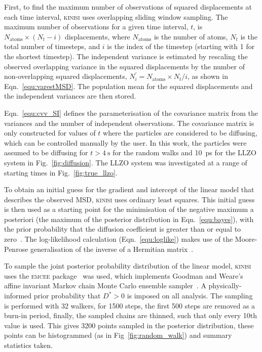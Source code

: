 \documentclass[reprint,superscriptaddress,nobibnotes,amsmath,amssymb,aps,prx,hidelinks]{revtex4-2}
\newcommand{\nind}[1]{\ensuremath{N^\prime_{#1}}}
\newcommand{\D}{\ensuremath{D^*}}
\begin{document}
First, to find the maximum number of observations of squared displacements at each time interval, \textsc{kinisi} uses overlapping sliding window sampling. 
The maximum number of observations for a given time interval, $t$, is $N_{\mathrm{atoms}} \times (N_{t} - i)$ displacements, where $N_{\mathrm{atoms}}$ is the number of atoms, $N_{t}$ is the total number of timesteps, and $i$ is the index of the timestep (starting with \num{1} for the shortest timestep). 
The independent variance is estimated by rescaling the observed overlapping variance in the squared displacements by the number of non-overlapping squared displacements, $\nind{i} = N_{\mathrm{atoms}} \times N_{t} / i$, as shown in Eqn.~\ref{equ:varestMSD}. 
The population mean for the squared displacements and the independent variances are then stored. 

Eqn.~\ref{equ:cvv_SI} defines the parameterisation of the covariance matrix from the variances and the number of independent observations. 
The covariance matrix is only constructed for values of $t$ where the particles are considered to be diffusing, which can be controlled manually by the user. 
In this work, the particles were assumed to be diffusing for $t>\SI{4}{\second}$ for the random walks and \SI{10}{\pico\second} for the LLZO system in Fig.~\ref{fig:diffusion}. 
The LLZO system was investigated at a range of starting times in Fig.~\ref{fig:true_llzo}. 

To obtain an initial guess for the gradient and intercept of the linear model that describes the observed MSD, \textsc{kinisi} uses ordinary least squares. 
This initial guess is then used as a starting point for the minimisation of the negative maximum a posteriori (the maximum of the posterior distribution in Eqn.~\ref{equ:bayes}), with the prior probability that the diffusion coefficient is greater than or equal to zero~\cite{broyden_convergence_1970,fletcher_new_1970,goldfarb_family_1970,shanno_conditioning_1970}.
The log-likelihood calculation (Eqn.~\ref{equ:loglike}) makes use of the Moore-Penrose generalisation of the inverse of a Hermitian matrix~\cite{moore_on_1920,bjerhammar_application_1951,penrose_generlized_1955}. 

To sample the joint posterior probability distribution of the linear model, \textsc{kinisi} uses the \textsc{emcee} package~\cite{foremanmackey_emcee_2019} was used, which implements Goodman and Weare's affine invariant Markov chain Monte Carlo ensemble sampler~\cite{goodman_ensemble_2010}. 
A physically-informed prior probability that $\D > 0$ is imposed on all analysis.
The sampling is performed with \num{32} walkers, for \num{1500} steps, the first \num{500} steps are removed as a burn-in period, finally, the sampled chains are thinned, such that only every \num{10}th value is used. 
This gives \num{3200} points sampled in the posterior distribution, these points can be histogrammed (as in Fig~\ref{fig:random_walk}) and summary statistics taken.
\end{document}
